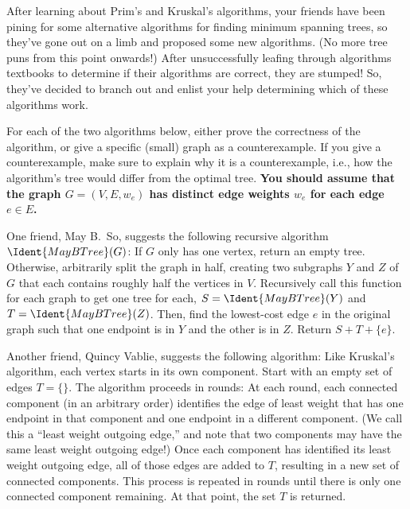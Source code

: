 \documentclass{ks-pset}
\begin{document}
\begin{problem}

  After learning about Prim's and Kruskal's algorithms, your friends have been
  pining for some alternative algorithms for finding minimum spanning trees, so
  they've gone out on a limb and proposed some new algorithms.  (No more tree puns
  from this point onwards!)  After unsuccessfully leafing through algorithms
  textbooks to determine if their algorithms are correct, they are stumped!  So,
  they've decided to branch out and enlist your help determining which of these
  algorithms work.

  For each of the two algorithms below, either prove the correctness of the
  algorithm, or give a specific (small) graph as a counterexample.  If you give
  a counterexample, make sure to explain why it is a counterexample, i.e., how
  the algorithm's tree would differ from the optimal tree.  \textbf{You should
    assume that the graph $G = (V, E, w_e)$ has distinct edge weights $w_e$ for
  each edge $e \in E$.}

  \begin{subproblems}
    \item One friend, May B.~So, suggests the following recursive algorithm
      \(\Ident{MayBTree}(G)\): If $G$ only has one vertex, return an empty
      tree. Otherwise, arbitrarily split the graph in half, creating two
      subgraphs $Y$ and $Z$ of $G$ that each contains roughly half the vertices
      in $V$. Recursively call this function for each graph to get one tree for
      each, $S = \Ident{MayBTree}(Y)$ and $T = \Ident{MayBTree}(Z)$.  Then,
      find the lowest-cost edge $e$ in the original graph such that one
      endpoint is in $Y$ and the other is in $Z$.  Return $S + T + \{e\}$.

    \item Another friend, Quincy Vablie, suggests the following algorithm: Like
      Kruskal's algorithm, each vertex starts in its own component.  Start with
      an empty set of edges $T = \{\}$.  The algorithm proceeds in rounds: At
      each round, each connected component (in an arbitrary order) identifies
      the edge of least weight that has one endpoint in that component and one
      endpoint in a different component.  (We call this a ``least weight
      outgoing edge,'' and note that two components may have the same least
      weight outgoing edge!) Once each component has identified its least
      weight outgoing edge, all of those edges are added to $T$, resulting in a
      new set of connected components.  This process is repeated in rounds
      until there is only one connected component remaining.  At that point,
      the set $T$ is returned.
  \end{subproblems}

\end{problem}
\end{document}
